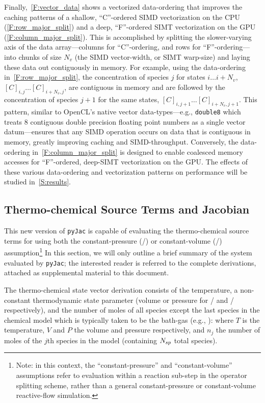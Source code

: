 \documentclass[12pt,number,sort&compress,preprint]{elsarticle}
\begin{document}
Finally,~\cref{F:vector_data} shows a vectorized data-ordering that improves the caching patterns of a shallow, ``C''-ordered SIMD vectorization on the CPU (\cref{F:row_major_split}) and a deep, ``F''-ordered SIMT vectorization on the GPU (\cref{F:column_major_split}).
This is accomplished by splitting the slower-varying axis of the data array---columns for ``C''-ordering, and rows for ``F''-ordering---into chunks of size $N_v$ (the SIMD vector-width, or SIMT warp-size) and laying these data out contiguously in memory.
For example, using the data-ordering in~\cref{F:row_major_split}, the concentration of species $j$ for states $i\ldots i+N_v$, $[C]_{i, j} \ldots [C]_{i + N_v, j}$, are contiguous in memory and are followed by the concentration of species $j + 1$ for the same states, $[C]_{i, j + 1} \ldots [C]_{i + N_v, j + 1}$.
This pattern, similar to OpenCL's native vector data-types---e.g., \texttt{double\num{8}} which treats \num{8} contiguous double precision floating point numbers as a single vector datum---ensures that any SIMD operation occurs on data that is contiguous in memory, greatly improving caching and SIMD-throughput.
Conversely, the data-ordering in~\cref{F:column_major_split} is designed to enable coalesced memory accesses for ``F''-ordered, deep-SIMT vectorization on the GPU.
The effects of these various data-ordering and vectorization patterns on performance will be studied in~\cref{S:results}.

\subsection{Thermo-chemical Source Terms and Jacobian}
This new version of \texttt{pyJac} is capable of evaluating the thermo-chemical source terms for using both the constant-pressure (\conp/) or constant-volume (\conv/) assumption\footnote{Note: in this context, the ``constant-pressure'' and ``constant-volume'' assumptions refer to evaluation within a reaction sub-step in the operator splitting scheme, rather than a general constant-pressure or constant-volume reactive-flow simulation.}
In this section, we will only outline a brief summary of the system evaluated by \texttt{pyJac}; the interested reader is referred to the complete derivations, attached as supplemental material to this document.


The thermo-chemical state vector derivation consists of the temperature, a non-constant thermodynamic state parameter (volume or pressure for \conp/ and \conv/ respectively), and the number of moles of all species except the last species in the chemical model which is typically taken to be the bath-gas (e.g., ):
where $T$ is the temperature, $V$ and $P$ the volume and pressure respectively, and $n_j$ the number of moles of the $j$th species in the model (containing $\ns/$ total species).
\end{document}

